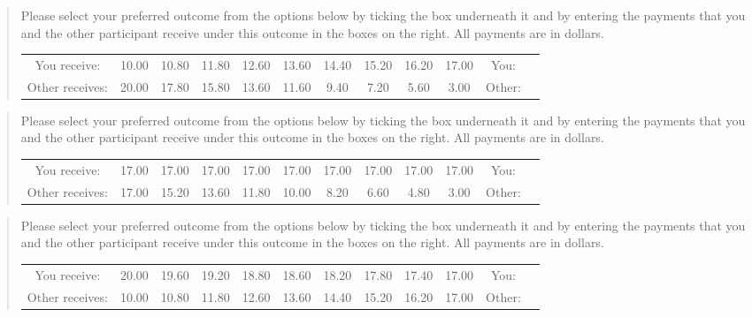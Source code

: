 \documentclass[11pt]{article}
\begin{document}
\begin{tcolorbox}
\begin{quote}
\begin{center}
Please select your preferred outcome from the options below by ticking the box underneath it and by entering the payments that you and the other participant receive under this outcome in the boxes on the right. All payments are in dollars.\\

\begin{tabular}{c|c|c|c|c|c|c|c|c|c|c|c|}
\cline{2-12} You receive: & 10.00&	10.80&	11.80&	12.60&	13.60&	14.40&	15.20&	16.20	&17.00 & You:& \\
Other receives: &20.00&	17.80&	15.80&	13.60	&11.60&	9.40	&7.20&	5.60	&3.00 &Other: & \\ \cline{2-12}
\end{tabular}
\end{center}
\end{quote}
\end{tcolorbox}
								
\begin{tcolorbox}
\begin{quote}
\begin{center}
Please select your preferred outcome from the options below by ticking the box underneath it and by entering the payments that you and the other participant receive under this outcome in the boxes on the right. All payments are in dollars.\\

\begin{tabular}{c|c|c|c|c|c|c|c|c|c|c|c|}
\cline{2-12}You receive: & 17.00&	17.00	&17.00&	17.00&	17.00&	17.00&	17.00&	17.00&	17.00 & You:& \\
Other receives: &17.00	&15.20	&13.60&	11.80	&10.00&	8.20&	6.60&	4.80&	3.00 &Other: & \\ \cline{2-12}
\end{tabular}
\end{center}
\end{quote}
\end{tcolorbox}

\begin{tcolorbox}
\begin{quote}
\begin{center}
Please select your preferred outcome from the options below by ticking the box underneath it and by entering the payments that you and the other participant receive under this outcome in the boxes on the right. All payments are in dollars.\\

\begin{tabular}{c|c|c|c|c|c|c|c|c|c|c|c|}
\cline{2-12} You receive: & 20.00&	19.60&	19.20&	18.80&	18.60&	18.20	&17.80&	17.40	&17.00  & You:& \\
Other receives: &10.00&	10.80&	11.80&	12.60&	13.60&	14.40&	15.20	&16.20	&17.00  &Other: & \\ \cline{2-12}
\end{tabular}
\end{center}
\end{quote}
\end{tcolorbox}
\end{document}
